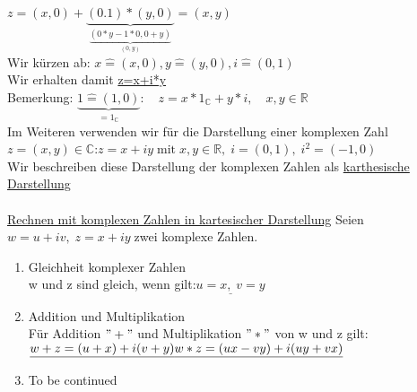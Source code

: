 \documentclass{article}
\theoremstyle{definition}
\theoremstyle{definition}
\begin{document}
$z=(x,0)+\underbrace{(0.1)\ast (y,0)}_{\underbrace{(0\ast y-1\ast 0,0+y)}_{(0,y)}}=(x,y)$\\
Wir kürzen ab: $x\widehat{=}(x,0), y\widehat{=}(y,0),i\widehat{=}(0,1)$\\
Wir erhalten damit \underline{z=x+i*y}\\
Bemerkung: $\underbrace{1\widehat{=}(1,0)}_{=1_{\mathbb{C}}}:\quad z=x\ast 1_{\mathbb{C}}+y\ast i,\quad x,y\in\mathbb{R}$\\
Im Weiteren verwenden wir für die Darstellung einer komplexen Zahl \\
$z=(x,y)\in\mathbb{C}$:\quad$z=x+iy\;\text{mit}\; x,y\in\mathbb{R},\; i=(0,1),\; i^{2}=(-1,0)$\\
Wir beschreiben diese Darstellung der komplexen Zahlen als \underline{karthesische Darstellung}\\
\\
\underline{Rechnen mit komplexen Zahlen in kartesischer Darstellung}
Seien $w=u+iv,\; z=x+iy\;$zwei komplexe Zahlen.
\begin{enumerate}
    \item Gleichheit komplexer Zahlen\\
          w und z sind gleich, wenn gilt:\quad$\underline{u=x,\; v=y}$\\
    \item Addition und Multiplikation\\
          Für Addition $"+"$ und Multiplikation $"\ast"$ von w und z gilt:\\
          $\underline{w+z=(u+x)+i(v+y)}\\
          \underline{w\ast z=(ux - vy)+i(uy+vx)}$
    \item To be continued
\end{enumerate}
\end{document}
